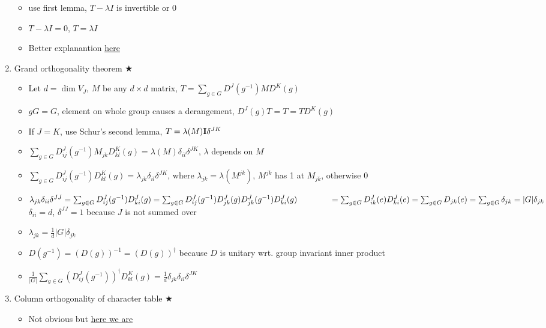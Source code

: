 \documentclass{article}
\theoremstyle{remark}
\theoremstyle{remark}
\newcommand{\myref}[1]{\hyperref[back:#1]{$\bigstar$}\label{#1}}
\begin{document}
\begin{enumerate}
\begin{itemize}
                \item use first lemma, $T-\lambda I$ is invertible or $0$
                \item $T-\lambda I=0$, $T=\lambda I$
                \item Better explanantion \href{https://sites.ualberta.ca/~vbouchar/MAPH464/section-schur.html}{here}
            \end{itemize}
        \item Grand orthogonality theorem \myref{thm:grand_orthogonality}\begin{itemize}
                \item Let $d=\dim V_J$, $M$ be any $d\times d$ matrix, $T=\sum_{g\in G}D^J(g^{-1})MD^K(g)$
                \item $gG=G$, element on whole group causes a derangement, $D^J(g)T=T=TD^K(g)$
                \item If $J=K$, use Schur's second lemma, $T=\lambda(M)\vb{I}\delta^{JK}$
                \item $\sum_{g\in G}D^J_{ij}(g^{-1})M_{jk}D^K_{kl}(g)=\lambda(M)\delta_{il}\delta^{JK}$, $\lambda$ depends on $M$
                \item $\sum_{g\in G}D^J_{ij}(g^{-1})D^K_{kl}(g)=\lambda_{jk}\delta_{il}\delta^{JK}$, where $\lambda_{jk}=\lambda(M^{jk})$, $M^{jk}$ has 1 at $M_{jk}$, otherwise 0
                \item $\lambda_{jk}\delta_{ii}\delta^{JJ}=\sum_{g\in G}D^J_{ij}(g^{-1})D^J_{ki}(g)=\sum_{g\in G}D_{ij}^J(g^{-1})D_{jk}^J(g)D_{jk}^J(g^{-1})D^J_{ki}(g)\\\null\qquad\qquad=\sum_{g\in G}D^J_{ik}(e)D^J_{ki}(e)=\sum_{g\in G}D_{jk}(e)=\sum_{g\in G}\delta_{jk}=|G|\delta_{jk}$\\
                $\delta_{ii}=d$, $\delta^{JJ}=1$ because $J$ is not summed over
                \item $\lambda_{jk}=\frac{1}{d}|G|\delta_{jk}$
                \item $D(g^{-1})=(D(g))^{-1}=(D(g))^\dagger$ because $D$ is unitary wrt. group invariant inner product
                \item $ \frac{1}{|G|}\sum_{g\in G}(D_{ij}^J(g^{-1}))^\dagger D_{kl}^K(g)=\frac{1}{d}\delta_{jk}\delta_{il}\delta^{JK}$
            \end{itemize}
        \item Column orthogonality of character table \myref{thm:col_orthog}\begin{itemize}
                \item Not obvious but \href{https://people.brandeis.edu/~igusa/Math101bS07/Math101b_notesD2e.pdf}{here we are}

\end{itemize}
\end{enumerate}
\end{document}
